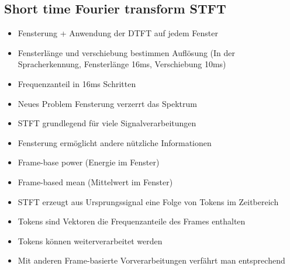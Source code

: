 \documentclass[a4paper,10pt,oneside]{article}
\begin{document}
\subsection{Short time Fourier transform STFT}
\begin{itemize}
	\item Fensterung + Anwendung der DTFT auf jedem Fenster
	\item Fensterlänge und verschiebung bestimmen Auflösung (In der Spracherkennung, Fensterlänge 16ms, Verschiebung 10ms)
	\item Frequenzanteil in 16ms Schritten
	\item Neues Problem Fensterung verzerrt das Spektrum
	\item STFT grundlegend für viele Signalverarbeitungen
	\item Fensterung ermöglicht andere nützliche Informationen
	\item Frame-base power (Energie im Fenster)
	\item Frame-based mean (Mittelwert im Fenster)
	\item STFT erzeugt aus Ursprungssignal eine Folge von Tokens im Zeitbereich
	\item Tokens sind Vektoren die Frequenzanteile des Frames enthalten
	\item Tokens können weiterverarbeitet werden
	\item Mit anderen Frame-basierte Vorverarbeitungen verfährt man entsprechend
\end{itemize}
\end{document}
